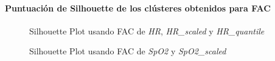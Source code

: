 \paragraph{Puntuación de Silhouette de los clústeres obtenidos para FAC}

\begin{figure}[H]
    \centering
    \caption{Silhouette Plot usando FAC de \textit{HR}, \textit{HR\_scaled} y \textit{HR\_quantile}}\label{fig:acf_si_fc}
\end{figure}

\begin{figure}[ht]
    \centering
    \hfill
    \caption{Silhouette Plot usando FAC de \textit{SpO2} y \textit{SpO2\_scaled}}\label{fig:acf_si_spo2}
\end{figure}

